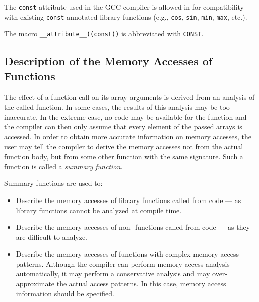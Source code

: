   The \lstinline!const! attribute used in the GCC compiler is allowed in
  \pencil for compatibility with existing \lstinline!const!-annotated
  library functions (e.g., \lstinline!cos!, \lstinline!sin!, \lstinline!min!,
  \lstinline!max!, etc.).

  The macro \lstinline!__attribute__((const))! is abbreviated with \lstinline!CONST!.
  
\subsection{Description of the Memory Accesses of Functions}
\label{sec:summaries}


  The effect of a function call on its array arguments is derived
  from an analysis of the called function.
  In some cases, the results of this analysis may be too inaccurate.
  In the extreme case, no code may be available for the function and the
  compiler can then only assume that every element of the passed arrays
  is accessed.
  In order to obtain more accurate information on memory accesses, the user
  may tell the compiler to derive the memory accesses not from the actual
  function body, but from some other function with the same signature.
  Such a function is called a \emph{summary function}.

  Summary functions are used to:
    \begin{itemize}
     \item Describe the memory accesses of library functions
     called from \pencil code --- as library functions cannot be analyzed at
     compile time.
     
     \item Describe the memory accesses of non-\pencil
     functions called from \pencil code --- as they are difficult
     to analyze.

     \item Describe the memory accesses of \pencil functions with complex
     memory access patterns.
     Although the compiler can perform memory access analysis automatically,
     it may perform a conservative analysis and may over-approximate the
     actual access patterns.  In this case, memory access information should
     be specified.
    \end{itemize}

